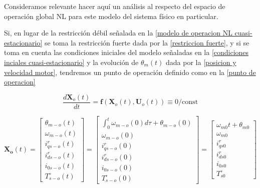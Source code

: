 \documentclass[a4paper, 10pt, onecolumn,journal]{ieeeconf}
\begin{document}
Consideramos relevante hacer aquí un análisis al respecto
del espacio de operación global NL para este modelo del sistema físico
en particular.

Si, en lugar de la restricción débil señalada en la \cref{modelo de operacion NL cuasi-estacionario}
se toma la restricción fuerte dada por la \cref{restriccion fuerte}, y si se toma en cuenta
las condiciones iniciales del modelo señaladas en la \cref{condiciones inciales cuasi-estacionario} y 
la evolución de $\theta_m(t)$ dada por la \cref{posicion y velocidad motor}, tendremos un
punto de operación definido como en la \cref{punto de operacion}


\begin{equation}
    \frac{d\mathbf{X}_o(t)}{dt} =  \mathbf{f}(\mathbf{X}_o(t), \mathbf{U}_o(t)) \equiv 0/\text{const}
    \label{restriccion fuerte}
\end{equation}

\begin{equation}
    \mathbf{X_o}(t)
    =
    \begin{bmatrix} 
        \theta_{m-o}(t) \\ 
        \omega_{m-o}(t) \\ 
        i^r_{qs-o}(t) \\ 
        i^r_{ds-o}(t)\\ 
        i_{0s-o}(t)\\ 
        T^\circ_{s-o}(t)
    \end{bmatrix}
    =
    \begin{bmatrix} 
        \int_{0}^{t} \omega_{m-o}(0) d\tau + \theta_{m-o}(0)\\
        \omega_{m-o}(0)\\
        i^r_{qs-o}(0) \\
        i^r_{ds-o}(0)\\
        i_{0s-o}(0)\\
        T^\circ_{s-o}(0)
    \end{bmatrix}
    =
    \begin{bmatrix} 
        \omega_{m0}t + \theta_{m0}\\
        \omega_{m0} \\ 
        i^r_{qs0} \\ 
        i^r_{ds0} \\ 
        i_{0s0} \\ 
        T^\circ_{s0} 
    \end{bmatrix}
    \label{punto de operacion}
\end{equation}
\end{document}
